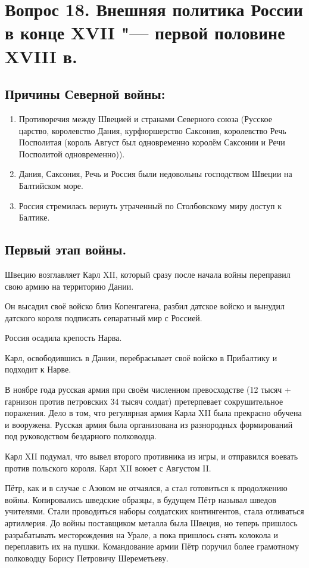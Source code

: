 \section{Вопрос 18. Внешняя политика России в конце XVII "--- первой половине XVIII в.}

\subsection{Причины Северной войны:}

\begin{enumerate}
    \item{ Противоречия между Швецией и странами Северного союза (Русское царство, королевство Дания, курфюршерство Саксония, королевство Речь Посполитая (король Август был одновременно королём Саксонии и Речи Посполитой одновременно)). }
    \item{ Дания, Саксония, Речь и Россия были недовольны господством Швеции на Балтийском море. }
    \item{ Россия стремилась вернуть утраченный по Столбовскому миру доступ к Балтике. }
\end{enumerate}

\subsection{Первый этап войны.}

Швецию возглавляет Карл XII, который сразу после начала войны переправил свою армию на территорию Дании. 

Он высадил своё войско близ Копенгагена, разбил датское войско и вынудил датского короля подписать сепаратный мир с Россией.

Россия осадила крепость Нарва.

Карл, освободившись в Дании, перебрасывает своё войско в Прибалтику и подходит к Нарве. 

В ноябре года русская армия при своём численном превосходстве (12 тысяч + гарнизон против петровских 34 тысяч солдат) претерпевает сокрушительное поражения. Дело в том, что регулярная армия Карла XII была прекрасно обучена и вооружена. Русская армия была организована из разнородных формирований под руководством бездарного полководца.

Карл XII подумал, что вывел второго противника из игры, и отправился воевать против польского короля. Карл XII воюет с Августом II. 

Пётр, как и в случае с Азовом не отчаялся, а стал готовиться к продолжению войны. Копировались шведские образцы, в будущем Пётр называл шведов учителями. Стали проводиться наборы солдатских контингентов, стала отливаться артиллерия. До войны поставщиком металла была Швеция, но теперь пришлось разрабатывать месторождения на Урале, а пока пришлось снять колокола и переплавить их на пушки. Командование армии Пётр поручил более грамотному полководцу Борису Петровичу Шереметьеву. 

